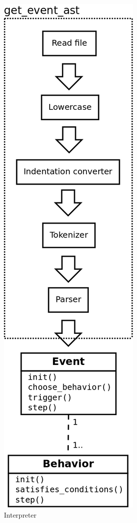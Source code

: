 \documentclass[11pt]{article}
\begin{document}
{\begin{figure}
	\begin{center}
		\includegraphics[width=.9\linewidth]{Interpreter}
	\end{center}
	\caption{Interpreter}
\end{figure}

}
\end{document}
